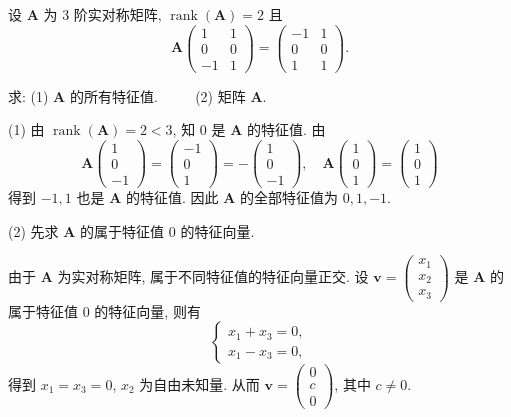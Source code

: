 \documentclass[../../main.tex]{subfiles}%
\begin{document}
\begin{example}
设 $\boldsymbol{A}$ 为 3 阶实对称矩阵, $\operatorname{rank}(\boldsymbol{A}) = 2$ 且
$$
\boldsymbol{A}\begin{pmatrix} 1 & 1 \\ 0 & 0 \\ -1 & 1 \end{pmatrix} = \begin{pmatrix} -1 & 1 \\ 0 & 0 \\ 1 & 1 \end{pmatrix}.
$$

求: (1) $\boldsymbol{A}$ 的所有特征值.
$\quad \quad$
(2) 矩阵 $\boldsymbol{A}$.
\end{example}
\begin{solution}

(1) 由 $\operatorname{rank}(\boldsymbol{A}) = 2 < 3$, 知 $0$ 是 $\boldsymbol{A}$ 的特征值. 由
$$
\boldsymbol{A}\begin{pmatrix} 1 \\ 0 \\ -1 \end{pmatrix} = \begin{pmatrix} -1 \\ 0 \\ 1 \end{pmatrix} = -\begin{pmatrix} 1 \\ 0 \\ -1 \end{pmatrix}, \quad \boldsymbol{A}\begin{pmatrix} 1 \\ 0 \\ 1 \end{pmatrix} = \begin{pmatrix} 1 \\ 0 \\ 1 \end{pmatrix}
$$
得到 $-1, 1$ 也是 $\boldsymbol{A}$ 的特征值. 因此 $\boldsymbol{A}$ 的全部特征值为 $0, 1, -1$.

(2) 先求 $\boldsymbol{A}$ 的属于特征值 $0$ 的特征向量.

由于 $\boldsymbol{A}$ 为实对称矩阵, 属于不同特征值的特征向量正交. 设 $\boldsymbol{v} = \begin{pmatrix} x_1 \\ x_2 \\ x_3 \end{pmatrix}$ 是 $\boldsymbol{A}$ 的属于特征值 $0$ 的特征向量, 则有
$$
\begin{cases}
x_1 + x_3 = 0, \\
x_1 - x_3 = 0,
\end{cases}
$$
得到 $x_1 = x_3 = 0$, $x_2$ 为自由未知量. 从而 $\boldsymbol{v} = \begin{pmatrix} 0 \\ c \\ 0 \end{pmatrix}$, 其中 $c \neq 0$.


\end{solution}
\end{document}
